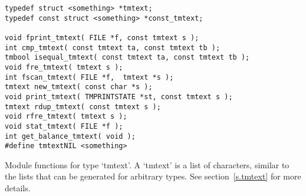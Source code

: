 \begin{verbatim}
typedef struct <something> *tmtext;
typedef const struct <something> *const_tmtext;

void fprint_tmtext( FILE *f, const tmtext s );
int cmp_tmtext( const tmtext ta, const tmtext tb );
tmbool isequal_tmtext( const tmtext ta, const tmtext tb );
void fre_tmtext( tmtext s );
int fscan_tmtext( FILE *f,  tmtext *s );
tmtext new_tmtext( const char *s );
void print_tmtext( TMPRINTSTATE *st, const tmtext s );
tmtext rdup_tmtext( const tmtext s );
void rfre_tmtext( tmtext s );
void stat_tmtext( FILE *f );
int get_balance_tmtext( void );
#define tmtextNIL <something>
\end{verbatim}
\begin{desc}
Module functions for type `tmtext'.
A `tmtext' is a list of characters, similar to the lists that can be
generated for arbitrary types. See section~\ref{s.tmtext} for more details.
\end{desc}
